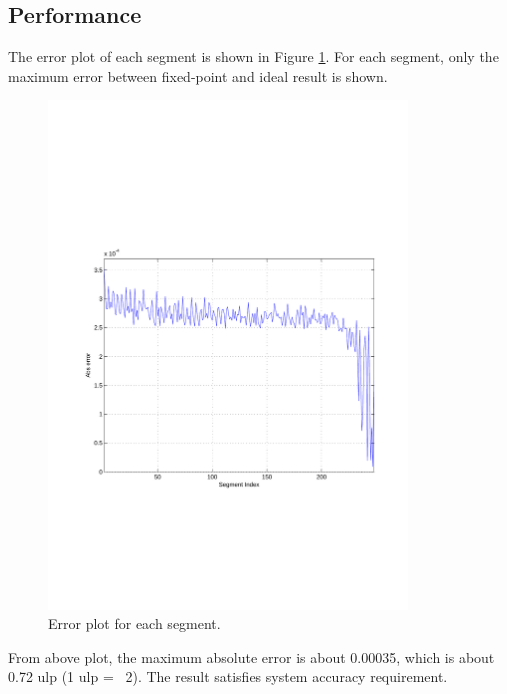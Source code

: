 \documentclass[a4paper, titlepage]{article}
\begin{document}
\subsection{Performance}
The error plot of each segment is shown in Figure \ref{fig:errplot}.
For each segment, only the maximum error between
fixed-point and ideal result is shown.
\begin{figure}[!htbp]
\centering
\includegraphics[width=0.85\textwidth]{errplot.pdf}
\caption{Error plot for each segment.}
\label{fig:errplot}
\end{figure}

From above plot, the maximum absolute error is about \num{0.00035},
which is about 0.72 ulp (1 ulp = \si{2}).
The result satisfies system accuracy requirement.
\end{document}
